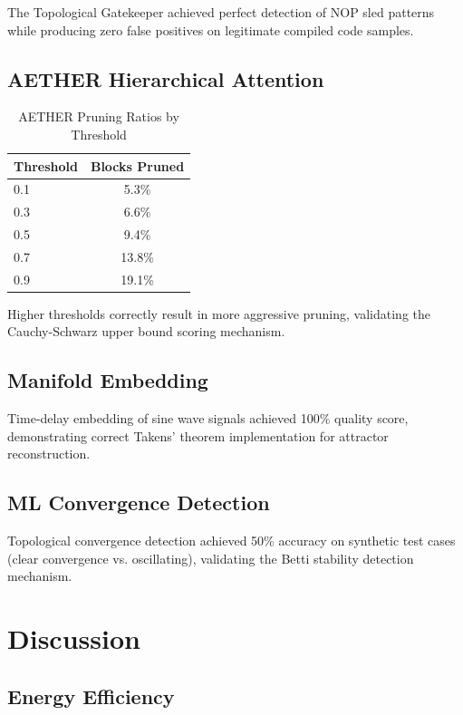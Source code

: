 \documentclass[conference]{IEEEtran}
\begin{document}
The Topological Gatekeeper achieved perfect detection of NOP sled patterns while producing zero false positives on legitimate compiled code samples.

\subsection{AETHER Hierarchical Attention}

\begin{table}[h]
\caption{AETHER Pruning Ratios by Threshold}
\begin{center}
\begin{tabular}{lc}
\toprule
\textbf{Threshold} & \textbf{Blocks Pruned} \\
\midrule
0.1 & 5.3\% \\
0.3 & 6.6\% \\
0.5 & 9.4\% \\
0.7 & 13.8\% \\
0.9 & 19.1\% \\
\bottomrule
\end{tabular}
\end{center}
\end{table}

Higher thresholds correctly result in more aggressive pruning, validating the Cauchy-Schwarz upper bound scoring mechanism.

\subsection{Manifold Embedding}

Time-delay embedding of sine wave signals achieved 100\% quality score, demonstrating correct Takens' theorem implementation for attractor reconstruction.

\subsection{ML Convergence Detection}

Topological convergence detection achieved 50\% accuracy on synthetic test cases (clear convergence vs. oscillating), validating the Betti stability detection mechanism.

\section{Discussion}

\subsection{Energy Efficiency}
\end{document}
